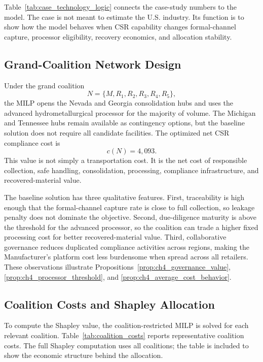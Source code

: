 Table~\ref{tab:case_technology_logic} connects the case-study numbers to the model. The case is not meant to estimate the U.S. industry. Its function is to show how the model behaves when CSR capability changes formal-channel capture, processor eligibility, recovery economics, and allocation stability.

\subsection{Grand-Coalition Network Design}

Under the grand coalition
\begin{equation*}
N=\{M,R_1,R_2,R_3,R_4,R_5\},
\end{equation*}
the MILP opens the Nevada and Georgia consolidation hubs and uses the advanced hydrometallurgical processor for the majority of volume. The Michigan and Tennessee hubs remain available as contingency options, but the baseline solution does not require all candidate facilities. The optimized net CSR compliance cost is
\begin{equation*}
c(N)=4{,}093.
\end{equation*}
This value is not simply a transportation cost. It is the net cost of responsible collection, safe handling, consolidation, processing, compliance infrastructure, and recovered-material value.

The baseline solution has three qualitative features. First, traceability is high enough that the formal-channel capture rate is close to full collection, so leakage penalty does not dominate the objective. Second, due-diligence maturity is above the threshold for the advanced processor, so the coalition can trade a higher fixed processing cost for better recovered-material value. Third, collaborative governance reduces duplicated compliance activities across regions, making the Manufacturer's platform cost less burdensome when spread across all retailers. These observations illustrate Propositions~\ref{prop:ch4_governance_value}, \ref{prop:ch4_processor_threshold}, and \ref{prop:ch4_average_cost_behavior}.

\subsection{Coalition Costs and Shapley Allocation}

To compute the Shapley value, the coalition-restricted MILP is solved for each relevant coalition. Table~\ref{tab:coalition_costs} reports representative coalition costs. The full Shapley computation uses all coalitions; the table is included to show the economic structure behind the allocation.

